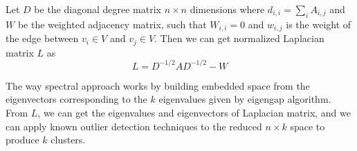 Let $D$ be the diagonal degree matrix $n \times n$ dimensions where $d_{i,i} = \sum_{i} A_{i,j}$ 
and $W$ be the weighted adjacency matrix, such that $W_{i,i} = 0$ and $w_{i,j}$ is the weight of the edge between $v_i \in V$ and $v_j \in V$. 
Then we can get normalized Laplacian matrix $L$ as 
\begin{equation}
L = D^{-1/2} A D^{-1/2} - W
\end{equation}

The way spectral approach works by building embedded space from the eigenvectors corresponding to the $k$ eigenvalues given by eigengap algorithm. 
From $L$, we can get the eigenvalues and eigenvectors of Laplacian matrix, and we can apply known outlier detection techniques \cite{knorr00} to the reduced $n \times k$ space to produce $k$ clusters. 
